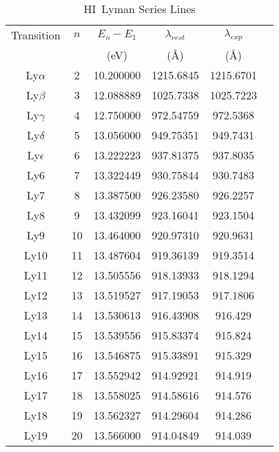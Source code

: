 \documentclass[graybox]{svmult}
\newcommand{\HI}{H{\sc I}}
\begin{document}
\begin{table}[ht]
\begin{center}
\caption{\HI\ Lyman Series Lines \label{tbl:energies}}
\begin{tabular}{cccccc}
\hline
Transition & $n$ & $E_n - E_1$ & $\lambda_{rest}$ & $\lambda_{exp}$ \\
& & (eV) & (\AA) & (\AA) \\
\hline
Ly$\alpha$&           2&       10.200000&       1215.6845& 1215.6701 \\
Ly$\beta$&            3&       12.088889&       1025.7338& 1025.7223\\
Ly$\gamma$&           4&       12.750000&       972.54759&  972.5368\\
Ly$\delta$&           5&       13.056000&       949.75351&  949.7431\\
Ly$\epsilon$&         6&       13.222223&       937.81375&  937.8035\\
Ly6&                  7&       13.322449&       930.75844&  930.7483\\
Ly7&                  8&       13.387500&       926.23580&  926.2257\\
Ly8&                  9&       13.432099&       923.16041&  923.1504\\
Ly9&                  10&       13.464000&       920.97310& 920.9631\\
Ly10&                 11&       13.487604&       919.36139& 919.3514\\
Ly11&                 12&       13.505556&       918.13933& 918.1294\\
Ly12&                 13&       13.519527&       917.19053& 917.1806\\
Ly13&                 14&       13.530613&       916.43908& 916.429\\
Ly14&                 15&       13.539556&       915.83374& 915.824\\
Ly15&                 16&       13.546875&       915.33891& 915.329\\
Ly16&                 17&       13.552942&       914.92921& 914.919\\
Ly17&                 18&       13.558025&       914.58616& 914.576\\
Ly18&                 19&       13.562327&       914.29604& 914.286\\
Ly19&                 20&       13.566000&       914.04849& 914.039\\
\hline
\end{tabular}
\end{center}
\end{table}
\end{document}
